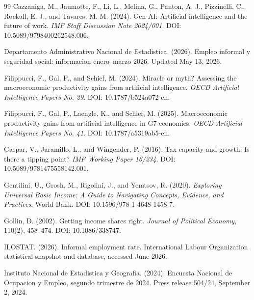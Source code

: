 \documentclass[11pt,a4paper]{article}
\begin{document}
\begin{thebibliography}{99}
Cazzaniga, M., Jaumotte, F., Li, L., Melina, G., Panton, A. J., Pizzinelli, C., Rockall, E. J., and Tavares, M. M. (2024).
\newblock Gen-AI: Artificial intelligence and the future of work.
\newblock \emph{IMF Staff Discussion Note 2024/001}. DOI: 10.5089/9798400262548.006.



Departamento Administrativo Nacional de Estadistica. (2026).
\newblock Empleo informal y seguridad social: informacion enero--marzo 2026.
\newblock Updated May 13, 2026.

Filippucci, F., Gal, P., and Schief, M. (2024).
\newblock Miracle or myth? Assessing the macroeconomic productivity gains from artificial intelligence.
\newblock \emph{OECD Artificial Intelligence Papers No. 29}. DOI: 10.1787/b524a072-en.


Filippucci, F., Gal, P., Laengle, K., and Schief, M. (2025).
\newblock Macroeconomic productivity gains from artificial intelligence in G7 economies.
\newblock \emph{OECD Artificial Intelligence Papers No. 41}. DOI: 10.1787/a5319ab5-en.


Gaspar, V., Jaramillo, L., and Wingender, P. (2016).
\newblock Tax capacity and growth: Is there a tipping point?
\newblock \emph{IMF Working Paper 16/234}. DOI: 10.5089/9781475558142.001.

Gentilini, U., Grosh, M., Rigolini, J., and Yemtsov, R. (2020).
\newblock \emph{Exploring Universal Basic Income: A Guide to Navigating Concepts, Evidence, and Practices}.
\newblock World Bank. DOI: 10.1596/978-1-4648-1458-7.


Gollin, D. (2002).
\newblock Getting income shares right.
\newblock \emph{Journal of Political Economy}, 110(2), 458--474. DOI: 10.1086/338747.

ILOSTAT. (2026).
\newblock Informal employment rate.
\newblock International Labour Organization statistical snapshot and database, accessed June 2026.

Instituto Nacional de Estadistica y Geografia. (2024).
\newblock Encuesta Nacional de Ocupacion y Empleo, segundo trimestre de 2024.
\newblock Press release 504/24, September 2, 2024.



\end{thebibliography}
\end{document}
